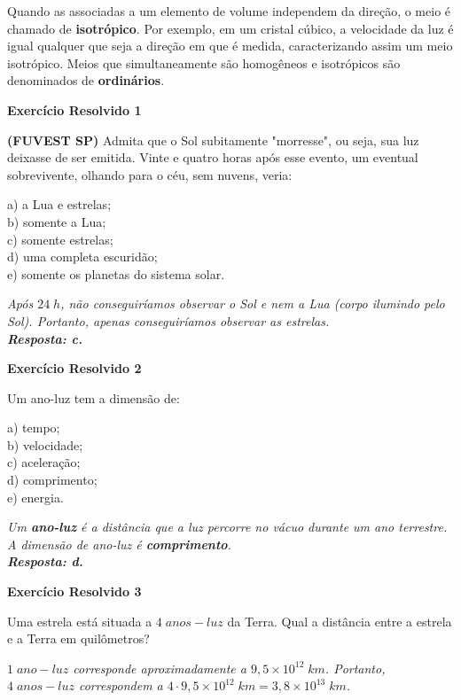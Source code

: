 \documentclass[11pt,twocolumn,oneside]{article}
\newenvironment{resposta*}
  {\bf Resposta:\\ }
  {}
\begin{document}
Quando as associadas a um elemento de volume independem da direção, o meio é chamado de \textbf{isotrópico}. Por exemplo, em um cristal cúbico, a velocidade da luz é igual qualquer que seja a direção em que é medida, caracterizando assim um meio isotrópico. Meios que simultaneamente são homogêneos e isotrópicos são denominados de \textbf{ordinários}.


\textbf{Exercício Resolvido 1}


\textbf{(FUVEST SP)} Admita que o Sol subitamente "morresse", ou seja, sua luz deixasse de ser emitida. Vinte e quatro horas após esse evento, um eventual sobrevivente, olhando para o céu, sem nuvens, veria:


a)	a Lua e estrelas; \\
b)	somente a Lua; \\
c)	somente estrelas; \\
d)	uma completa escuridão; \\
e)	somente os planetas do sistema solar.


\begin{resposta*}
{\it Após $24\;h$, não conseguiríamos observar o Sol e nem a Lua (corpo ilumindo pelo Sol). Portanto, apenas conseguiríamos observar as estrelas. \\
\textbf{Resposta: c.}}
\end{resposta*}

\textbf{Exercício Resolvido 2}


Um ano-luz tem a dimensão de:


a) tempo; \\
b) velocidade; \\
c) aceleração; \\
d) comprimento; \\
e) energia.


\begin{resposta*}
{\it Um \textbf{ano-luz} é a distância que a luz percorre no vácuo durante um ano terrestre. A dimensão de ano-luz é \textbf{comprimento}. \\
\textbf{Resposta: d.}}
\end{resposta*}

\textbf{Exercício Resolvido 3}


Uma estrela está situada a $4\;anos-luz$ da Terra. Qual a distância entre a estrela e a Terra em quilômetros?


\begin{resposta*}
{\it $1\;ano-luz$ corresponde aproximadamente a $9,5\times 10^{12}\;km$. Portanto, $4\;anos-luz$ correspondem a $4\cdot 9,5\times 10^{12}\;km = 3,8\times 10^{13}\;km$.}
\end{resposta*}
\end{document}
